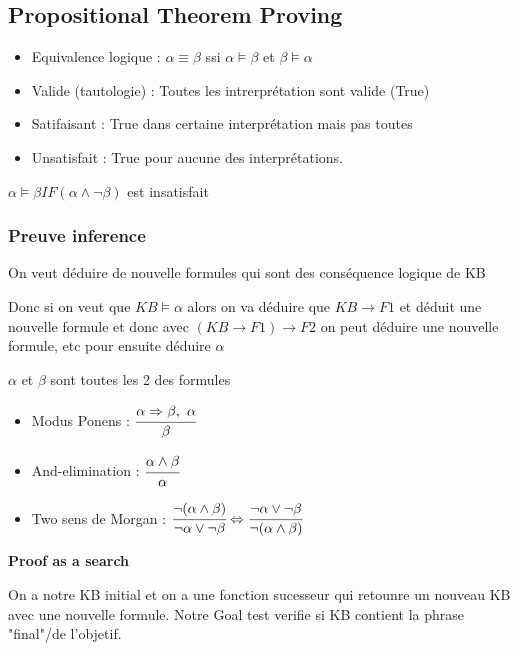 	\subsection{Propositional Theorem Proving}
		\begin{itemize}
			\item Equivalence logique : $\alpha \equiv \beta$ ssi $\alpha \models \beta$ et $\beta \models \alpha$
			\item Valide (tautologie) : Toutes les intrerprétation sont valide (True)
			\item Satifaisant : True dans certaine interprétation mais pas toutes
			\item Unsatisfait : True pour aucune des interprétations.
			
		\end{itemize}
		
		$\alpha \models \beta IF (\alpha \wedge \neg\beta)$ est insatisfait
			
		\subsubsection{Preuve inference}
		
		On veut déduire de nouvelle formules qui sont des conséquence logique de KB
		
		Donc si on veut que $KB \models \alpha$ alors on va déduire que $KB \rightarrow F1$ et déduit une nouvelle formule et donc avec $(KB\rightarrow F1) \rightarrow F2$ on peut déduire une nouvelle formule, etc pour ensuite déduire $\alpha$
		
		
			$\alpha$ et $\beta$ sont toutes les 2 des formules 		
			\begin{itemize}
				\item Modus Ponens : $\cfrac{\alpha \Rightarrow \beta, \ \alpha}{\beta}$
				\item And-elimination : $\cfrac{\alpha \wedge \beta}{\alpha}$
				\item Two sens de Morgan : $\cfrac{\neg(\alpha\wedge\beta)}{\neg \alpha \vee \neg \beta} \Leftrightarrow \cfrac{\neg \alpha\vee\neg\beta}{\neg (\alpha \wedge\beta)}$

			\end{itemize}
			
			\textbf{Proof as a search}
				
				On a notre KB initial et on a une fonction sucesseur qui retounre un nouveau KB avec une nouvelle formule. Notre Goal test verifie si KB contient la phrase "final"/de l'objetif.
				
